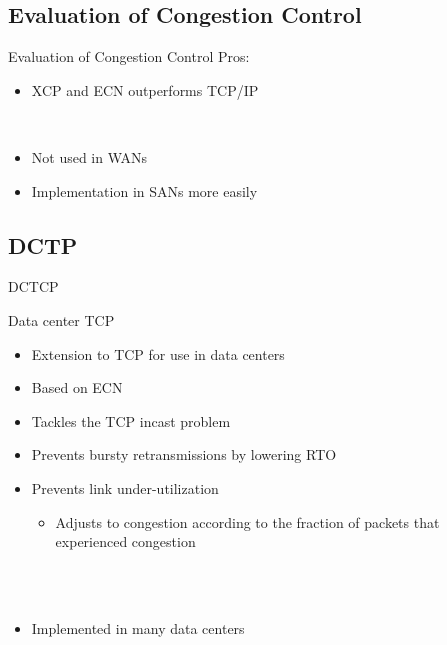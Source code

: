 \documentclass[english,aspectratio=43,t]{beamer}
\begin{document}
\subsection{Evaluation of Congestion Control}
\label{sec:eval}
\begin{frame}{Evaluation of Congestion Control}
Pros:
\begin{itemize}
\item XCP and ECN outperforms TCP/IP
\end{itemize}
~\\
\begin{itemize}
\item<3->[$\Rightarrow$] Not used in WANs
\item<4->[$\Rightarrow$] Implementation in SANs more easily
\end{itemize}
\end{frame}

\subsection{DCTP}
\label{sec:dctp}
\begin{frame}{DCTCP}
~\\
\begin{block}{Data center TCP}
\begin{itemize}
\item Extension to TCP for use in data centers
\item Based on ECN
\end{itemize}
\end{block}
\begin{itemize}
\item<2-> Tackles the TCP incast problem
\item<3-> Prevents bursty retransmissions by lowering RTO
\item<3-> Prevents link under-utilization
\begin{itemize}
\item <4-> Adjusts to congestion according to the fraction of packets that experienced congestion
\end{itemize}
~\\~\\
\item<5->[$\Rightarrow$] Implemented in many data centers
\end{itemize}
\end{frame}
\end{document}

